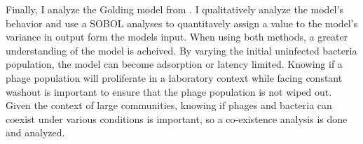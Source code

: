 \documentclass[11pt, oneside, draft]{Thesis}
\begin{document}
{    Finally, I analyze the Golding model from \citet{gengUsingBacterialPopulation2024}. 
    I qualitatively analyze the model's behavior and use a SOBOL analyses to quantitavely assign a value to the model's variance in output form the models input. 
    When using both methods, a greater understanding of the model is acheived. 
    By varying the initial uninfected bacteria population, the model can become adsorption or latency limited. 
    Knowing if a phage population will proliferate in a laboratory context while facing constant washout is important to ensure that the phage population is not wiped out. 
    Given the context of large communities, knowing if phages and bacteria can coexist under various conditions is important, so a co-existence analysis is done and analyzed. 

}
\clearpage 

\end{document}
